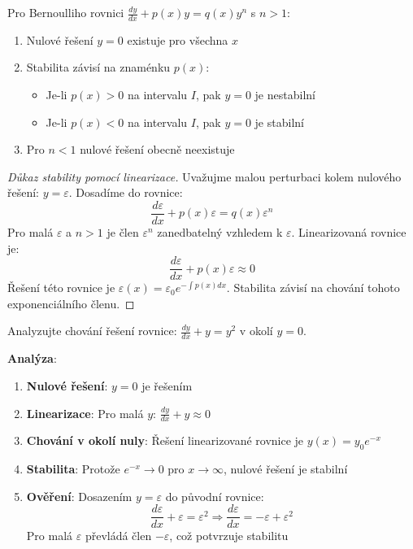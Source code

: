 \vspace{0.8\baselineskip}

\begin{theorem}
\label{th:stabilita-nuloveho-reseni}
Pro Bernoulliho rovnici $\frac{dy}{dx} + p(x)y = q(x)y^n$ s $n > 1$:
\begin{enumerate}
\item Nulové řešení $y = 0$ existuje pro všechna $x$
\item Stabilita závisí na znaménku $p(x)$:
\begin{itemize}
\item Je-li $p(x) > 0$ na intervalu $I$, pak $y = 0$ je nestabilní
\item Je-li $p(x) < 0$ na intervalu $I$, pak $y = 0$ je stabilní
\end{itemize}
\item Pro $n < 1$ nulové řešení obecně neexistuje
\end{enumerate}
\end{theorem}

\vspace{0.6\baselineskip}

\begin{proof}[Důkaz stability pomocí linearizace]
Uvažujme malou perturbaci kolem nulového řešení: $y = \varepsilon$. Dosadíme do rovnice:
\[
\frac{d\varepsilon}{dx} + p(x)\varepsilon = q(x)\varepsilon^n
\]
Pro malá $\varepsilon$ a $n > 1$ je člen $\varepsilon^n$ zanedbatelný vzhledem k $\varepsilon$. Linearizovaná rovnice je:
\[
\frac{d\varepsilon}{dx} + p(x)\varepsilon \approx 0
\]
Řešení této rovnice je $\varepsilon(x) = \varepsilon_0 e^{-\int p(x)dx}$. Stabilita závisí na chování tohoto exponenciálního členu.
\end{proof}

\vspace{0.8\baselineskip}

\begin{example}[Analýza singularity pro $n = 2$]
\label{ex:analyza-singularity-n2}
Analyzujte chování řešení rovnice: $\frac{dy}{dx} + y = y^2$ v okolí $y = 0$.

\textbf{Analýza}:
\begin{enumerate}
\item \textbf{Nulové řešení}: $y = 0$ je řešením
\item \textbf{Linearizace}: Pro malá $y$: $\frac{dy}{dx} + y \approx 0$
\item \textbf{Chování v okolí nuly}: Řešení linearizované rovnice je $y(x) = y_0 e^{-x}$
\item \textbf{Stabilita}: Protože $e^{-x} \to 0$ pro $x \to \infty$, nulové řešení je stabilní
\item \textbf{Ověření}: Dosazením $y = \varepsilon$ do původní rovnice:
\[
\frac{d\varepsilon}{dx} + \varepsilon = \varepsilon^2 \Rightarrow \frac{d\varepsilon}{dx} = -\varepsilon + \varepsilon^2
\]
Pro malá $\varepsilon$ převládá člen $-\varepsilon$, což potvrzuje stabilitu
\end{enumerate}
\end{example}


